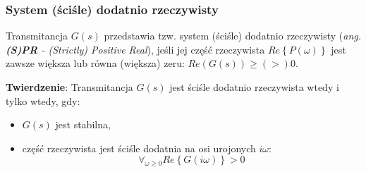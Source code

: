 \documentclass{article}
\begin{document}
        \subsubsection{System (ściśle) dodatnio rzeczywisty}\label{sec:spr}
        Transmitancja $G(s)$ przedstawia tzw. system (ściśle) dodatnio rzeczywisty (\textit{ang.} \textit{\textbf{(S)PR} - (Strictly) Positive Real}), jeśli jej część rzeczywista $Re\left\{P(\omega)\right\}$ jest zawsze większa lub równa (większa) zeru: $Re(G(s)) \geq (>) 0$.

        \textbf{Twierdzenie}: Transmitancja $G(s)$ jest ściśle dodatnio rzeczywista wtedy i tylko wtedy, gdy:
        \begin{itemize}
            \item $G(s)$ jest stabilna,
            \item część rzeczywista jest ściśle dodatnia na osi urojonych $i\omega$:
            $$
                \forall_{\omega \geq 0}Re\left\{ G(i\omega) \right\} > 0
            $$
        \end{itemize}
\end{document}
